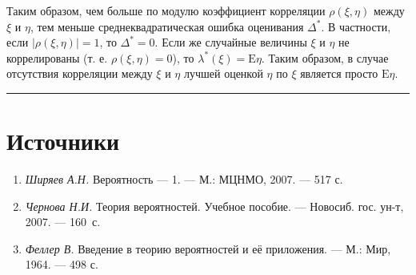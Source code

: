 \documentclass[11pt,a4paper]{article}
\providecommand{\tightlist}{%
      \setlength{\itemsep}{0pt}\setlength{\parskip}{0pt}}
\begin{document}
Таким образом, чем больше по модулю коэффициент корреляции
\(\rho(\xi, \eta)\) между \(\xi\) и \(\eta\), тем меньше
среднеквадратическая ошибка оценивания \(\Delta^\ast\). В частности,
если \(|\rho(\xi, \eta)|=1\), то \(\Delta^\ast = 0\). Если же случайные
величины \(\xi\) и \(\eta\) не коррелированы (т. е.
\(\rho(\xi, \eta)=0\)), то \(\lambda^\ast(\xi) = \mathrm{E}\eta\). Таким
образом, в случае отсутствия корреляции между \(\xi\) и \(\eta\) лучшей
оценкой \(\eta\) по \(\xi\) является просто \(\mathrm{E}\eta\).

    \begin{center}\rule{0.5\linewidth}{0.5pt}\end{center}

    \hypertarget{ux438ux441ux442ux43eux447ux43dux438ux43aux438}{%
\section{Источники}\label{ux438ux441ux442ux43eux447ux43dux438ux43aux438}}

\begin{enumerate}
\def\labelenumi{\arabic{enumi}.}
\tightlist
\item
  \emph{Ширяев А.Н.} Вероятность --- 1. --- М.: МЦНМО, 2007. --- 517 с.
\item
  \emph{Чернова Н.И.} Теория вероятностей. Учебное пособие. ---
  Новосиб. гос. ун-т, 2007. --- 160~с.
\item
  \emph{Феллер В.} Введение в теорию вероятностей и её приложения. ---
  М.: Мир, 1964. --- 498 с.
\end{enumerate}


    
    
    
\end{document}

